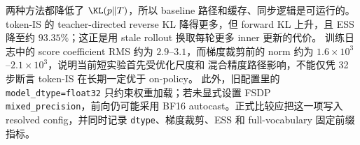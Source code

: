 两种方法都降低了 $\KL(p\Vert T)$，所以 baseline 路径和缓存、同步逻辑是可运行的。
token-IS 的 teacher-directed reverse KL 降得更多，但 forward KL 上升，且 ESS
降至约 $93.35\%$；这正是用 stale rollout 换取每轮更多 inner 更新的代价。
训练日志中的 score coefficient RMS 约为 $2.9$--$3.1$，而梯度裁剪前的 norm
约为 $1.6\times10^3$--$2.1\times10^3$，说明当前短实验首先受优化尺度和
混合精度路径影响，不能仅凭 32 步断言 token-IS 在长期一定优于 on-policy。
此外，旧配置里的 \texttt{model\_dtype=float32} 只约束权重加载；若未显式设置 FSDP
\texttt{mixed\_precision}，前向仍可能采用 BF16 autocast。正式比较应把这一项写入 resolved
config，并同时记录 \texttt{dtype}、梯度裁剪、ESS 和 full-vocabulary 固定前缀指标。
